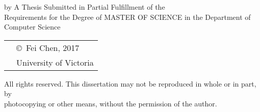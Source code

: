 \pagebreak
{
\centering
\thesistitle
\tpbreak
by
\tpbreak
\nameanddegrees
\tpbreak
A Thesis Submitted in Partial Fulfillment of the \\
Requirements for the Degree of
\tpbreak
MASTER OF SCIENCE
\tpbreak
in the Department of Computer Science\\
\vfill
\begin{tabular}{cl}
& \copyright\ Fei Chen, 2017\\
& \phantom{\copyright} University of Victoria
\end{tabular}
\tpbreak
All rights reserved. This dissertation may not be reproduced in whole or in part, by \\
\hfill photocopying or other means, without the permission of the author. 
\hfill
}
\pagebreak
